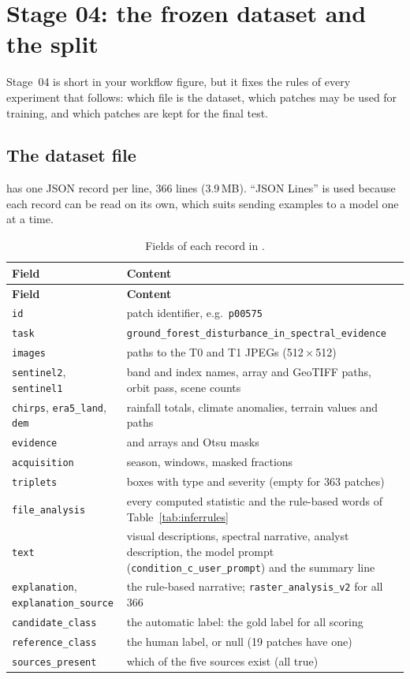 \chapter{Stage 04: the frozen dataset and the split}
\label{ch:stage04}

Stage~04 is short in your workflow figure, but it fixes the rules of every experiment that follows: which file is the dataset, which patches may be used for training, and which patches are kept for the final test.

\section{The dataset file}

 has one JSON record per line, 366 lines (3.9\,MB). ``JSON Lines'' is used because each record can be read on its own, which suits sending examples to a model one at a time.

\begin{longtable}{L{3.8cm}L{10.4cm}}
\caption{Fields of each record in .}\label{tab:jsonl}\\
\toprule
\textbf{Field} & \textbf{Content} \\
\midrule
\endfirsthead
\toprule
\textbf{Field} & \textbf{Content} \\
\midrule
\endhead
\texttt{id} & patch identifier, e.g.\ \texttt{p00575} \\
\texttt{task} & \texttt{ground\_forest\_disturbance\_in\_spectral\_evidence} \\
\texttt{images} & paths to the T0 and T1 JPEGs (512\,$\times$\,512) \\
\texttt{sentinel2}, \texttt{sentinel1} & band and index names, array and GeoTIFF paths, orbit pass, scene counts \\
\texttt{chirps}, \texttt{era5\_land}, \texttt{dem} & rainfall totals, climate anomalies, terrain values and paths \\
\texttt{evidence} & \dndvi{} and \dnbr{} arrays and Otsu masks \\
\texttt{acquisition} & season, windows, masked fractions \\
\texttt{triplets} & boxes with type and severity (empty for 363 patches) \\
\texttt{file\_analysis} & every computed statistic and the rule-based words of Table~\ref{tab:inferrules} \\
\texttt{text} & visual descriptions, spectral narrative, analyst description, the model prompt (\texttt{condition\_c\_user\_prompt}) and the summary line \\
\texttt{explanation}, \texttt{explanation\_source} & the rule-based narrative; \texttt{raster\_analysis\_v2} for all 366 \\
\texttt{candidate\_class} & the automatic label: the gold label for all scoring \\
\texttt{reference\_class} & the human label, or null (19 patches have one) \\
\texttt{sources\_present} & which of the five sources exist (all true) \\
\bottomrule
\end{longtable}

